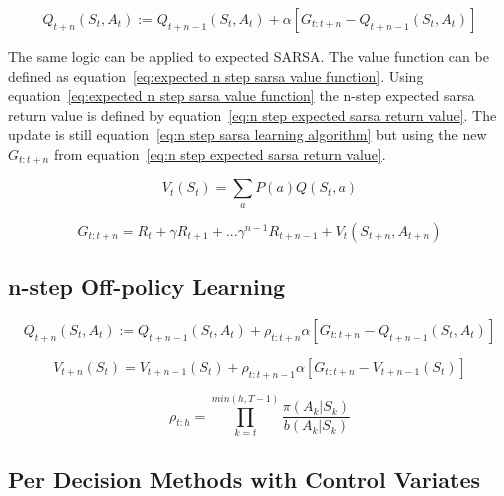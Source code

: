 \begin{equation}
Q_{t+n}(S_{t}, A_{t}) := Q_{t+n-1}(S_t, A_t) + \alpha \left[G_{t:t+n} - Q_{t+n-1}(S_t, A_t)\right]
\label{eq:n step sarsa learning algorithm}
\end{equation}

The same logic can be applied to expected SARSA. The value function can be defined as equation~\ref{eq:expected n step sarsa value function}. Using equation~\ref{eq:expected n step sarsa value function} the n-step expected sarsa return value is defined by equation~\ref{eq:n step expected sarsa return value}. The update is still equation~\ref{eq:n step sarsa learning algorithm} but using the new $G_{t:t+n}$ from equation~\ref{eq:n step expected sarsa return value}.

\begin{equation}
V_t(S_t) = \sum_a P(a) Q(S_t, a)
\label{eq:expected n step sarsa value function}
\end{equation}

\begin{equation}
G_{t:t+n} = R_{t} + \gamma R_{t+1} + ... \gamma^{n-1} R_{t+n-1} + V_t(S_{t+n}, A_{t+n})
\label{eq:n step expected sarsa return value}
\end{equation}

\subsection{n-step Off-policy Learning}

\begin{equation}
Q_{t+n}(S_{t}, A_{t}) := Q_{t+n-1}(S_t, A_t) + \rho_{t:t+n} \alpha \left[G_{t:t+n} - Q_{t+n-1}(S_t, A_t)\right]
\label{eq:n step off policy sarsa learning algorithm}
\end{equation}

\begin{equation}
V_{t+n}(S_t) = V_{t+n-1}(S_t) + \rho_{t:t+n-1} \alpha [G_{t:t+n} - V_{t+n-1}(S_t)]
\label{eq:state learning algorithm n-step off policy return}
\end{equation}

\begin{equation}
\rho_{t:h} = \prod_{k=t}^{min(h, T-1)} \frac{\pi(A_k|S_k)}{b(A_k|S_k)}
\label{eq:n step off policy sarsa importance sampling ratio}
\end{equation}

\subsection{Per Decision  Methods with Control Variates}

